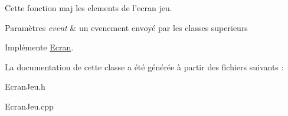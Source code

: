 \-Cette fonction maj les elements de l'ecran jeu. 


\begin{DoxyParams}{\-Paramètres}
{\em event} & un evenement envoyé par les classes superieurs \\
\hline
\end{DoxyParams}


\-Implémente \hyperlink{classEcran}{\-Ecran}.



\-La documentation de cette classe a été générée à partir des fichiers suivants \-:\begin{DoxyCompactItemize}
\item 
\-Ecran\-Jeu.\-h\item 
\-Ecran\-Jeu.\-cpp\end{DoxyCompactItemize}
